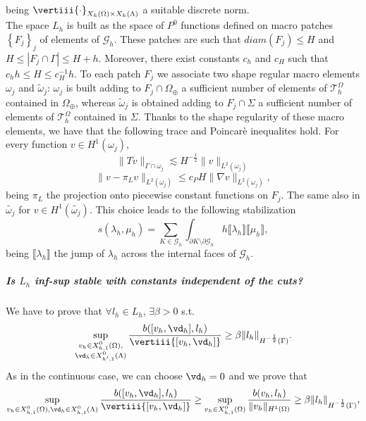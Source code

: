 being $\vertiii{\cdot }_{X_h(\Omega)\times X_h(\Lambda) }$ a suitable discrete norm. \\
The space $L_h$ is built as the space of $P^0$ functions defined on macro patches $\left\{ F_j \right\}_j$ of elements of $\mathcal{G}_h$. These patches are such that $diam(F_j)\leq H$ and  $H\leq |F_j\cap \Gamma|\leq H+h$. Moreover, there exist constants $c_h$ and $c_H$ such that $c_hh\leq H \leq c_H^{-1}h$. To each patch $F_j$ we associate two shape regular macro elements $\omega_j$ and $\tilde{\omega}_j$: $\omega_j$ is built adding to $F_j \cap \Omega_{\oplus}$ a sufficient number of elements of $\mathcal{T}_h^{\Omega}$ contained in $\Omega_{\oplus}$, whereas $\tilde{\omega}_j$ is obtained adding to $F_j \cap\Sigma$ a sufficient number of elements of $\mathcal{T}_h^{\Omega}$ contained in $\Sigma$. Thanks to the shape regularity of these macro elements, we have that the following trace and Poincarè inequalites hold. For every function $v\in H^1(\omega_j)$,
\begin{equation}\label{discr_trace_ineq}
\|Tv\|_{\Gamma\cap \omega_j} \lesssim H^{-\frac 12} \|v\|_{L^2(\omega_j)}
\end{equation}
\begin{equation}\label{disc_poincare_ineq}
\|v- \pi_Lv\|_{L^2(\omega_j)} \leq c_P H \|\nabla v\|_{L^2(\omega_j)},
\end{equation}
being $\pi_L$ the projection onto piecewise constant functions on $F_j$.
The same also in $\tilde{\omega _j}$ for $v\in H^1(\tilde{\omega _j})$. This choice leads to the following stabilization 
\begin{equation*}
s(\lambda_h, \mu_h)= \sum _{K\in \mathcal{G}_h} \int_{\partial K \setminus \partial \mathcal{G}_h} h \llbracket \lambda_h \rrbracket \llbracket \mu_h \rrbracket,
\end{equation*}
being $\llbracket \lambda_h \rrbracket$ the jump of $\lambda_h$ across the internal faces of $\mathcal{G}_h$.
\subparagraph{Is $L_h$ inf-sup stable with constants independent of the cuts?} We have to prove that $\forall l_h \in L_h$, $\exists \beta >0$ s.t.
\begin{equation*}
\sup_{\substack{v_h \in X_{h,1}^0(\Omega),\\ {\vd}_h \in X_{h',1}^0(\Lambda)}} \frac{b([v_h, {\vd}_h], l_h)}{\vertiii{[v_h, {\vd}_h]}} \geq \beta \|l_h\|_{H^{-\frac 12}(\Gamma)}.
\end{equation*}
As in the continuous case, we can choose ${\vd}_h=0$ and we prove that
\begin{equation*} 
\sup_{v_h \in X_{h,1}^0(\Omega),\\ {\vd}_h \in X_{h,1}^0(\Lambda)} \frac{b([v_h, {\vd}_h], l_h)}{\vertiii{[v_h, {\vd}_h]}} \geq  \sup_{v_h \in X_{h,1}^0(\Omega)} \frac{b(v_h, l_h)}{\|v_h\|_{H^1(\Omega)}} \geq \beta \|l_h\|_{H^{-\frac 12}(\Gamma)}, 
\end{equation*}
